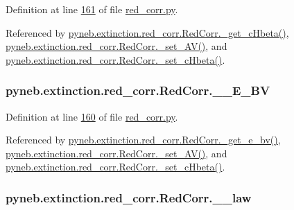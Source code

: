 \begin{DoxyVerb}
Definition at line \hyperlink{red__corr_8py_source_l00161}{161} of file \hyperlink{red__corr_8py_source}{red\-\_\-corr.\-py}.



Referenced by \hyperlink{red__corr_8py_source_l00152}{pyneb.\-extinction.\-red\-\_\-corr.\-Red\-Corr.\-\_\-get\-\_\-c\-Hbeta()}, \hyperlink{red__corr_8py_source_l00169}{pyneb.\-extinction.\-red\-\_\-corr.\-Red\-Corr.\-\_\-set\-\_\-\-A\-V()}, and \hyperlink{red__corr_8py_source_l00164}{pyneb.\-extinction.\-red\-\_\-corr.\-Red\-Corr.\-\_\-set\-\_\-c\-Hbeta()}.

\hypertarget{classpyneb_1_1extinction_1_1red__corr_1_1_red_corr_ad223ec4556fb47fc607488c318e58b13}{
\subsubsection[{\-\_\-\-\_\-\-E\-\_\-\-B\-V}]{\setlength{\rightskip}{0pt plus 5cm}pyneb.\-extinction.\-red\-\_\-corr.\-Red\-Corr.\-\_\-\-\_\-\-E\-\_\-\-B\-V\hspace{0.3cm}{\ttfamily [private]}}}\label{classpyneb_1_1extinction_1_1red__corr_1_1_red_corr_ad223ec4556fb47fc607488c318e58b13}


Definition at line \hyperlink{red__corr_8py_source_l00160}{160} of file \hyperlink{red__corr_8py_source}{red\-\_\-corr.\-py}.



Referenced by \hyperlink{red__corr_8py_source_l00146}{pyneb.\-extinction.\-red\-\_\-corr.\-Red\-Corr.\-\_\-get\-\_\-e\-\_\-bv()}, \hyperlink{red__corr_8py_source_l00169}{pyneb.\-extinction.\-red\-\_\-corr.\-Red\-Corr.\-\_\-set\-\_\-\-A\-V()}, and \hyperlink{red__corr_8py_source_l00164}{pyneb.\-extinction.\-red\-\_\-corr.\-Red\-Corr.\-\_\-set\-\_\-c\-Hbeta()}.

\hypertarget{classpyneb_1_1extinction_1_1red__corr_1_1_red_corr_a08b0e3499e1b8a289d7b2c7e805e6129}{
\subsubsection[{\-\_\-\-\_\-law}]{\setlength{\rightskip}{0pt plus 5cm}pyneb.\-extinction.\-red\-\_\-corr.\-Red\-Corr.\-\_\-\-\_\-law\hspace{0.3cm}{\ttfamily [private]}}}\label{classpyneb_1_1extinction_1_1red__corr_1_1_red_corr_a08b0e3499e1b8a289d7b2c7e805e6129}



\end{DoxyVerb}

